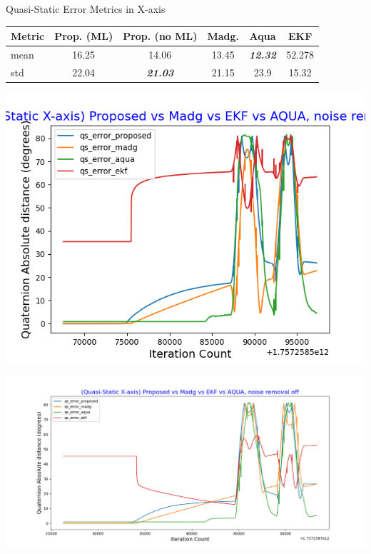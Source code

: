 \documentclass[aspectratio=169,xcolor=dvipsnames]{beamer}
\begin{document}
\begin{frame}{Quasi-Static Error Metrics in X-axis}
\small
\begin{minipage}{\textwidth}
  \centering
  \scriptsize
  \label{tab:quasi_static_x}
  \begin{tabular}{lccccc}
    \toprule
    Metric & Prop. (ML) & Prop. (no ML) & Madg. & Aqua & EKF \\
    \midrule
    mean & 16.25 & 14.06 & 13.45 & \textit{\textbf{12.32}} & 52.278 \\
    std & 22.04 & \textit{\textbf{21.03}} & 21.15 & 23.9 & 15.32 \\
    \bottomrule
  \end{tabular}
\end{minipage}

\vspace{0.5cm}

\begin{minipage}{0.5\textwidth}
  \centering
  \includegraphics[width=\linewidth,height=0.35\textheight]{graphs/qs_ml_x.png}
\end{minipage}%
\hfill
\begin{minipage}{0.5\textwidth}
  \centering
  \includegraphics[width=\linewidth]{graphs/qs_no_ml_x.png}
\end{minipage}

\end{frame}
\end{document}
